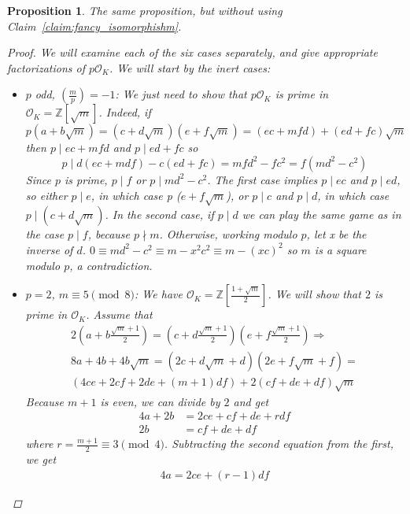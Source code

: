 \documentclass[11pt]{article}
\newtheorem{prop}{Proposition}
\theoremstyle{definition}
\begin{document}
    \begin{prop}
        The same proposition, but without using Claim~\ref{claim:fancy_isomorphishm}.
        \begin{proof}
            We will examine each of the six cases separately, and give appropriate factorizations of $p\mathcal{O}_K$.
            We will start by the inert cases:
            \begin{itemize}

                \item $p$ odd, $\left( \frac{m}{p} \right) = -1$: We just need to show that $p \mathcal{O}_K$ is prime in $\mathcal{O}_K = \mathbb{Z}\left[\sqrt {m}\right]$.
                Indeed, if \[p\left(a+b\sqrt {m}\right) = \left(c+d\sqrt{m}\right)\left(e+f\sqrt{m}\right) = (ec + mfd) + (ed + fc)\sqrt{m}\]
                then $p \mid ec + mfd$ and $p \mid ed + fc$ so
                \[p \mid d(ec+mdf) - c(ed+fc) = mfd^2 - fc^2 = f(md^2 - c^2)\]
                Since $p$ is prime, $p \mid f$ or $p \mid md^2 - c^2$.
                The first case implies $p \mid ec$ and $p \mid ed$, so either $p \mid e$,
                in which case p \mid ($e + f \sqrt {m}$), or $p \mid c$ and $p \mid d$,
                in which case $p \mid \left(c + d \sqrt {m}\right)$.
                In the second case, if $p \mid d$ we can play the same game as in the case $p \mid f$, because $p \nmid m$.
                Otherwise, working modulo $p$, let x be the inverse of $d$.
                $0 \equiv md^2-c^2 \equiv m - x^2c^2 \equiv m - (xc)^2$ so $m$ is a square modulo $p$, a contradiction.

                \item $p=2$, $m \equiv 5 \pmod 8$: We have $\mathcal{O}_K = \mathbb{Z}\left[\frac{1+\sqrt {m}}{2}\right]$.
                We will show that $2$ is prime in $\mathcal{O}_K$.
                Assume that
                \begin{gather}
                    2\left(a+b\frac{\sqrt {m}+1}{2}\right) = \left(c+d\frac{\sqrt {m}+1}{2}\right)\left(e+f\frac{\sqrt {m}+1}{2}\right) \Rightarrow \nonumber \\
                    8a + 4b + 4b\sqrt {m} =
                    (2c+d\sqrt {m}+d)(2e+f\sqrt {m}+f) = \nonumber \\
                    (4ce + 2cf + 2de + (m+1)df) + 2(cf+de+df)\sqrt {m} \nonumber
                \end{gather}
                Because $m+1$ is even, we can divide by $2$ and get
                \begin{align*}
                    4a + 2b &= 2ce + cf + de + rdf \nonumber \\
                    2b &= cf+ de + df \nonumber
                \end{align*}
                where $r = \frac{m+1}{2} \equiv 3 \pmod 4$.
                 Subtracting the second equation from the first, we get
                \begin{align*}
                    4a = 2ce + (r-1)df
                \end{align*}
            \end{itemize}
        \end{proof}
    \end{prop}
\end{document}
